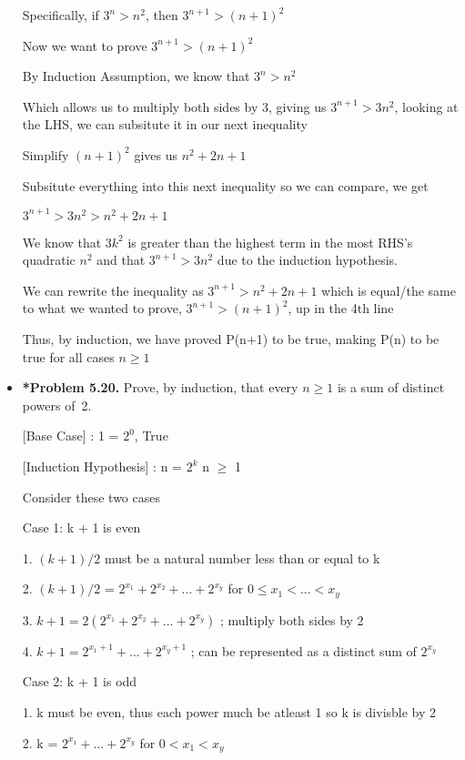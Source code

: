 \documentclass[11pt]{article}
\begin{document}
\begin{itemize}
  Specifically, if $3^n > n^2$, then $3^{n+1} > (n+1)^2$

  Now we want to prove $3^{n+1} > (n+1)^2$

  By Induction Assumption, we know that $3^n > n^2$

  Which allows us to multiply both sides by 3, giving us $3^{n+1} > 3n^2$, looking at the LHS, we can subsitute it in our next inequality

  Simplify $(n+1)^2$ gives us $ n^2 + 2n +1$
  
  Subsitute everything into this next inequality so we can compare, we get

  $3^{n+1} > 3n^2 > n^2 + 2n + 1$

  We know that $3k^2$ is greater than the highest term in the most RHS's quadratic $n^2$ and that $3^{n+1} > 3n^2$ due to the induction hypothesis. 

  We can rewrite the inequality as $3^{n+1} > n^2 + 2n + 1$ which is equal/the same to what we wanted to prove, $3^{n+1} > (n+1)^2$, up in the 4th line
  
  Thus, by induction, we have proved P(n+1) to be true, making P(n) to be true for all cases $n \geq 1$

\vspace{0.1in}

\item \textbf{*Problem 5.20.}
  Prove, by induction, that every $n\ge 1$ is a sum of distinct powers of~2.

  [Base Case] : 1 = $2^0$, True

  [Induction Hypothesis] : n = $2^k$ n $\geq$ 1

  Consider these two cases

  Case 1: k + 1 is even

  1. $(k+1)/2$ must be a natural number less than or equal to k

  2. $(k+1)/2$ = $2^{x_1} + 2^{x_2} + . . . + 2^{x_y} $ for $0 \leq x_1 < ... < x_y$ 

  3. $k+1 = 2(2^{x_1} + 2^{x_2} + ... + 2^{x_y})$ ; multiply both sides by 2

  4. $k+1 = 2^{x_1+1} + ... + 2^{x_y+1}$ ; can be represented as a distinct sum of $2^{x_y}$
  
  Case 2: k + 1 is odd

  1. k must be even, thus each power much be atleast 1 so k is divisble by 2

  2. k = $2^{x_1} + ... +2^{x_y}$ for $0 < x_1 < x_y$


\end{itemize}
\end{document}
